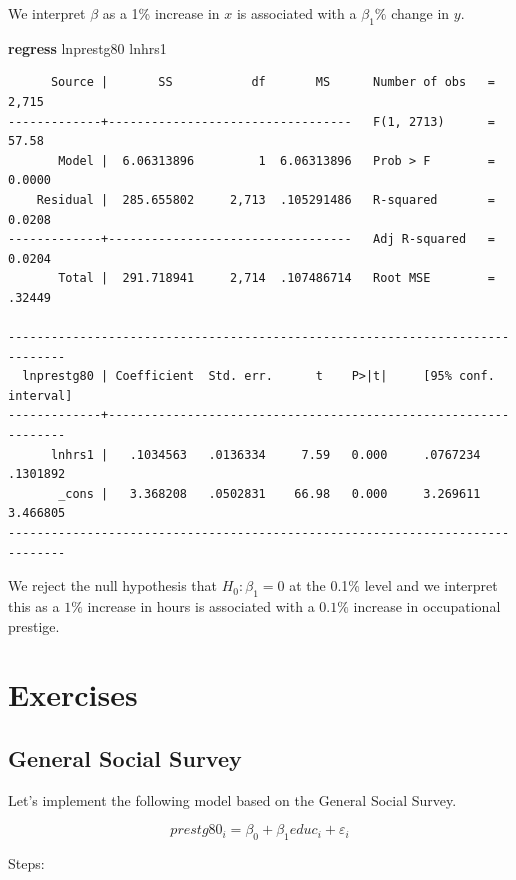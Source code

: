 \documentclass[
]{book}
\newenvironment{Shaded}{\begin{snugshade}}{\end{snugshade}}
\newcommand{\KeywordTok}[1]{\textcolor[rgb]{0.13,0.29,0.53}{\textbf{#1}}}
\newcommand{\NormalTok}[1]{#1}
\begin{document}
We interpret \(\beta\) as a 1\% increase in \(x\) is associated with a \(\beta_1\%\) change in \(y\).

\begin{Shaded}
\begin{Highlighting}[]
\KeywordTok{regress}\NormalTok{ lnprestg80 lnhrs1}
\end{Highlighting}
\end{Shaded}

\begin{verbatim}
      Source |       SS           df       MS      Number of obs   =     2,715
-------------+----------------------------------   F(1, 2713)      =     57.58
       Model |  6.06313896         1  6.06313896   Prob > F        =    0.0000
    Residual |  285.655802     2,713  .105291486   R-squared       =    0.0208
-------------+----------------------------------   Adj R-squared   =    0.0204
       Total |  291.718941     2,714  .107486714   Root MSE        =    .32449

------------------------------------------------------------------------------
  lnprestg80 | Coefficient  Std. err.      t    P>|t|     [95% conf. interval]
-------------+----------------------------------------------------------------
      lnhrs1 |   .1034563   .0136334     7.59   0.000     .0767234    .1301892
       _cons |   3.368208   .0502831    66.98   0.000     3.269611    3.466805
------------------------------------------------------------------------------
\end{verbatim}

We reject the null hypothesis that \(H_0: \beta_1 = 0\) at the 0.1\% level and we interpret this as a \(1\%\) increase in hours is associated with a \(0.1\%\) increase in occupational prestige.

\chapter{Exercises}\label{exercises}

\section{General Social Survey}\label{general-social-survey}

Let's implement the following model based on the General Social Survey.

\[ prestg80_i = \beta_0 + \beta_1 educ_i + \varepsilon_i \]

Steps:
\end{document}
